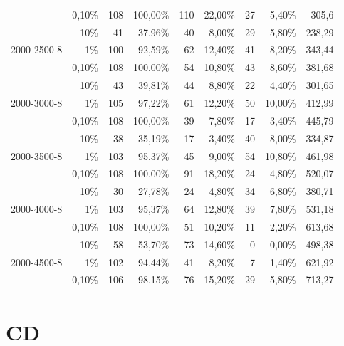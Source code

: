 \documentclass[pdftex,a4paper,12pt,twoside]{report}
\theoremstyle{plain} \newtheorem{theorem}{Theorem} \newtheorem{proposition}{Proposition} \newtheorem{lemma}{Lemma} \newtheorem*{corollary}{Corollary}
\theoremstyle{definition} \newtheorem{definition}{Definition} \newtheorem{conjecture}{Conjecture} \newtheorem*{example}{Example} \newtheorem{algorithm}{Algorithm}
\theoremstyle{remark} \newtheorem*{remark}{Remark} \newtheorem*{note}{Note} \newtheorem{case}{Case}
\begin{document}
\begin{table}
\begin{tabular}{rrrrrrrrr}
    \multicolumn{1}{c}{} & 0,10\% & 108   & 100,00\% & 110   & 22,00\% & 27    & 5,40\% & 305,6 \\
    \multicolumn{1}{c}{\multirow{3}[0]{*}{2000-2500-8}} & 10\%  & 41    & 37,96\% & 40    & 8,00\% & 29    & 5,80\% & 238,29 \\
    \multicolumn{1}{c}{} & 1\%   & 100   & 92,59\% & 62    & 12,40\% & 41    & 8,20\% & 343,44 \\
    \multicolumn{1}{c}{} & 0,10\% & 108   & 100,00\% & 54    & 10,80\% & 43    & 8,60\% & 381,68 \\
    \multicolumn{1}{c}{\multirow{3}[0]{*}{2000-3000-8}} & 10\%  & 43    & 39,81\% & 44    & 8,80\% & 22    & 4,40\% & 301,65 \\
    \multicolumn{1}{c}{} & 1\%   & 105   & 97,22\% & 61    & 12,20\% & 50    & 10,00\% & 412,99 \\
    \multicolumn{1}{c}{} & 0,10\% & 108   & 100,00\% & 39    & 7,80\% & 17    & 3,40\% & 445,79 \\
    \multicolumn{1}{c}{\multirow{3}[0]{*}{2000-3500-8}} & 10\%  & 38    & 35,19\% & 17    & 3,40\% & 40    & 8,00\% & 334,87 \\
    \multicolumn{1}{c}{} & 1\%   & 103   & 95,37\% & 45    & 9,00\% & 54    & 10,80\% & 461,98 \\
    \multicolumn{1}{c}{} & 0,10\% & 108   & 100,00\% & 91    & 18,20\% & 24    & 4,80\% & 520,07 \\
    \multicolumn{1}{c}{\multirow{3}[0]{*}{2000-4000-8}} & 10\%  & 30    & 27,78\% & 24    & 4,80\% & 34    & 6,80\% & 380,71 \\
    \multicolumn{1}{c}{} & 1\%   & 103   & 95,37\% & 64    & 12,80\% & 39    & 7,80\% & 531,18 \\
    \multicolumn{1}{c}{} & 0,10\% & 108   & 100,00\% & 51    & 10,20\% & 11    & 2,20\% & 613,68 \\
    \multicolumn{1}{c}{\multirow{3}[0]{*}{2000-4500-8}} & 10\%  & 58    & 53,70\% & 73    & 14,60\% & 0     & 0,00\% & 498,38 \\
    \multicolumn{1}{c}{} & 1\%   & 102   & 94,44\% & 41    & 8,20\% & 7     & 1,40\% & 621,92 \\
    \multicolumn{1}{c}{} & 0,10\% & 106   & 98,15\% & 76    & 15,20\% & 29    & 5,80\% & 713,27 \\
    \bottomrule
    \end{tabular}%
  \label{tab:PCRR}%
\end{table}

\cleardoublepage


%
%
\cleardoublepage

\listoffigures
\listoftables

\cleardoublepage
\lstlistoflistings
%

\cleardoublepage
\chapter{CD}
\label{ch:cd}
\end{document}
